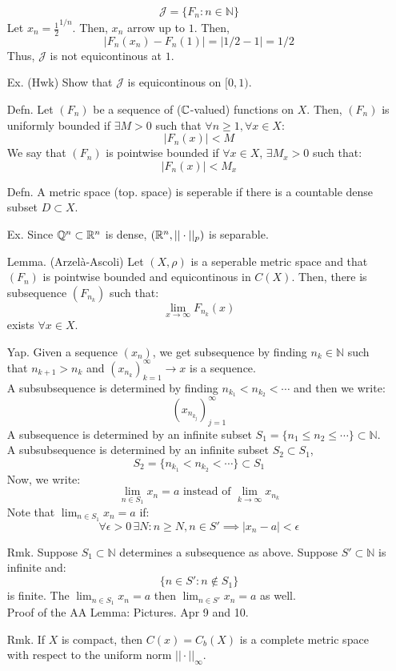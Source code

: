 \documentclass[12pt]{article}
\begin{document}
\begin{itemize}
    \[\mathcal{J} = \{F_n: n \in \mathbb{N}\}\]
    Let $x_n = \frac{1}{2}^{1/n}$. Then, $x_n$ arrow up to $1$. Then, 
    \[ |F_n(x_n) - F_n(1)| = |1/2 -1| = 1/2\]
    Thus, $\mathcal{J}$ is not equicontinous at $1$.
    \item[Ex. (Hwk)] Show that $\mathcal{J}$ is equicontinous on $[0, 1)$. 
    \item[Defn.] Let $(F_n)$ be a sequence of ($\mathbb C$-valued) functions on $X$. Then, $(F_n)$ is uniformly bounded if $\exists M > 0$ such that $\forall n \geq 1, \forall x \in X$:
    \[ |F_n(x)| < M \]
    We say that $(F_n)$ is pointwise bounded if $\forall x \in X$, $\exists M_x > 0$ such that:
    \[ |F_n(x)| < M_x \]
    \item[Defn.] A metric space (top. space) is seperable if there is a countable dense subset $D \subset X$. 
    \item[Ex.] Since $\mathbb Q^n \subset \mathbb R^n$ is dense, $(\mathbb R^n, ||\cdot||_p)$ is separable.  
    \item[Lemma.] (Arzelà-Ascoli) Let $(X, \rho)$ is a seperable metric space and that $(F_n)$ is pointwise bounded and equicontinous in $C(X)$. Then, there is subsequence $(F_{n_k})$ such that:
        \[ \lim_{x\to\infty} F_{n_k}(x)\]
    exists $\forall x \in X$.
    \item[Yap.] Given a sequence $(x_n)$, we get subsequence by finding $n_k \in \mathbb{N}$ such that $n_{k+1} > n_k$ and $(x_{n_k})_{k=1}^\infty \to x$ is a sequence. \\
    A subsubsequence is determined by finding $n_{k_1} < n_{k_2} < \cdots$ and then we write: 
    \[ (x_{n_{k_j}})_{j=1}^\infty\]
    A subsequence is determined by an infinite subset $S_1 = \{n_1 \leq n_2 \leq \cdots\} \subset \mathbb{N}$. A subsubsequence is determined by an infinite subset $S_2 \subset S_1$, 
    \[ S_2 = \{n_{k_1} < n_{k_2} < \cdots \} \subset S_1\]
    Now, we write: 
    \[ \lim_{n \in S_1} x_n = a \text{ instead of } \lim_{k \to \infty} x_{n_k}\]
    Note that $\lim_{n \in S_1} x_n = a$ if:
    \[ \forall \epsilon > 0\, \exists N: n \geq N, n \in S' \implies |x_n - a| < \epsilon\] 
    \item[Rmk.] Suppose $S_1 \subset \mathbb{N}$ determines a subsequence as above. Suppose $S' \subset \mathbb{N}$ is infinite and:
    \[\{n \in S' : n \not \in S_1\}\]
    is finite. The $\lim_{n \in S_1} x_n = a$ then $\lim_{n \in S'} x_n = a$ as well. \\
    Proof of the AA Lemma: Pictures. Apr 9 and 10.
    \item[Rmk.] If $X$ is compact, then $C(x) = C_b(X)$ is a complete metric space with respect to the uniform norm $||\cdot||_\infty$. 

\end{itemize}
\end{document}
